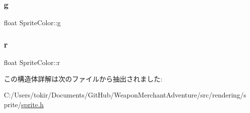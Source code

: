 \subsubsection{\texorpdfstring{g}{g}}
{\footnotesize\ttfamily float Sprite\+Color\+::g}

\mbox{\label{struct_sprite_color_a640d8864838a78db2a9d5f1840e24882}} 
\subsubsection{\texorpdfstring{r}{r}}
{\footnotesize\ttfamily float Sprite\+Color\+::r}



この構造体詳解は次のファイルから抽出されました\+:\begin{DoxyCompactItemize}
\item 
C\+:/\+Users/tokir/\+Documents/\+Git\+Hub/\+Weapon\+Merchant\+Adventure/src/rendering/sprite/\mbox{\hyperlink{sprite_8h}{sprite.\+h}}\end{DoxyCompactItemize}

